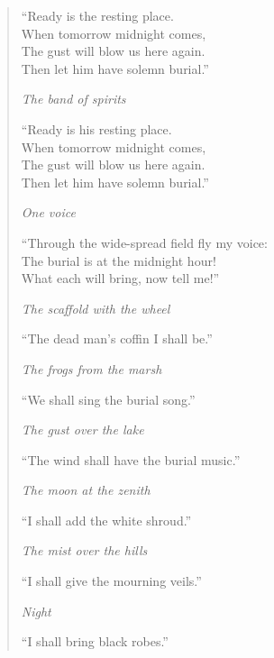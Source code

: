 \begin{verse}
``Ready is the resting place. \\
When tomorrow midnight comes, \\
The gust will blow us here again. \\
Then let him have solemn burial.”

\smallskip

\textit{The band of spirits}

\smallskip

``Ready is his resting place. \\
When tomorrow midnight comes, \\
The gust will blow us here again. \\
Then let him have solemn burial.”

\smallskip

\textit{One voice}

\smallskip

``Through the wide-spread field fly my voice: \\
The burial is at the midnight hour! \\
What each will bring, now tell me!”

\smallskip

\textit{The scaffold with the wheel}

\smallskip

``The dead man’s coffin I shall be.”

\smallskip

\textit{The frogs from the marsh}

\smallskip

``We shall sing the burial song.”

\smallskip

\textit{The gust over the lake}

\smallskip

``The wind shall have the burial music.”

\smallskip

\textit{The moon at the zenith}

\smallskip

``I shall add the white shroud.”

\smallskip

\textit{The mist over the hills}

``I shall give the mourning veils.”

\smallskip

\textit{Night}

\smallskip

``I shall bring black robes.”


\end{verse}
